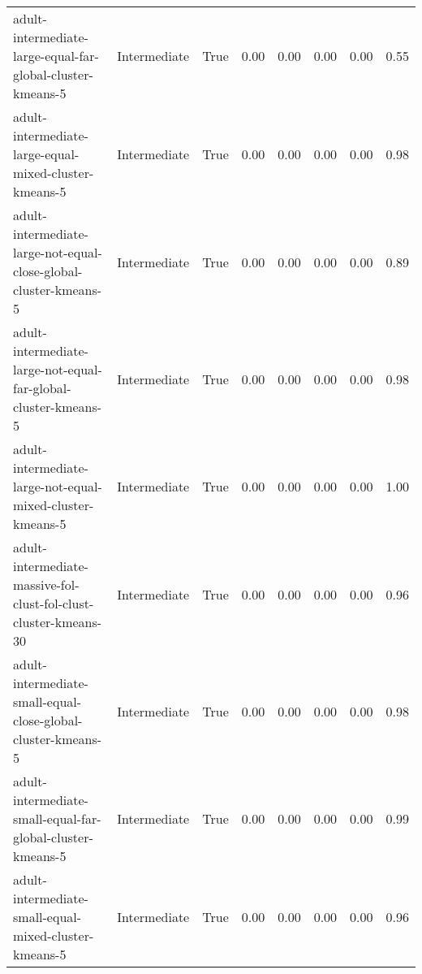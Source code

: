 \begin{longtable}{llllllll}
                                                   adult-intermediate-large-equal-far-global-cluster-kmeans-5 & Intermediate &        True &                 0.00 &                 0.00 &                         0.00 &                         0.00 &                         0.55 \\
                                                        adult-intermediate-large-equal-mixed-cluster-kmeans-5 & Intermediate &        True &                 0.00 &                 0.00 &                         0.00 &                         0.00 &                         0.98 \\
                                             adult-intermediate-large-not-equal-close-global-cluster-kmeans-5 & Intermediate &        True &                 0.00 &                 0.00 &                         0.00 &                         0.00 &                         0.89 \\
                                               adult-intermediate-large-not-equal-far-global-cluster-kmeans-5 & Intermediate &        True &                 0.00 &                 0.00 &                         0.00 &                         0.00 &                         0.98 \\
                                                    adult-intermediate-large-not-equal-mixed-cluster-kmeans-5 & Intermediate &        True &                 0.00 &                 0.00 &                         0.00 &                         0.00 &                         1.00 \\
                                             adult-intermediate-massive-fol-clust-fol-clust-cluster-kmeans-30 & Intermediate &        True &                 0.00 &                 0.00 &                         0.00 &                         0.00 &                         0.96 \\
                                                 adult-intermediate-small-equal-close-global-cluster-kmeans-5 & Intermediate &        True &                 0.00 &                 0.00 &                         0.00 &                         0.00 &                         0.98 \\
                                                   adult-intermediate-small-equal-far-global-cluster-kmeans-5 & Intermediate &        True &                 0.00 &                 0.00 &                         0.00 &                         0.00 &                         0.99 \\
                                                        adult-intermediate-small-equal-mixed-cluster-kmeans-5 & Intermediate &        True &                 0.00 &                 0.00 &                         0.00 &                         0.00 &                         0.96 \\

\end{longtable}
